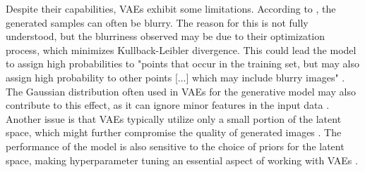 Despite their capabilities, VAEs exhibit some limitations. According to \citeauthor{GoodfellowDeepLearning}, the generated samples can often be blurry. The reason for this is not fully 
understood, but the blurriness observed may be due to their optimization process, which minimizes Kullback-Leibler divergence. This could lead the model to assign high probabilities to "points that occur in the training set, but may also assign high probability to other points [...] which may include blurry images" \citep{GoodfellowDeepLearning}. The Gaussian distribution often used in VAEs for the generative model may also contribute to this effect, as it can ignore minor features in the input data \citep{GoodfellowDeepLearning}. Another issue is that VAEs typically utilize only a small portion of the latent space, which might further compromise the quality of generated images \citep{GoodfellowDeepLearning}. The performance of the model is also sensitive to the choice of priors for the latent space, making hyperparameter tuning an essential aspect of working with VAEs \citep{kingmaVAE, higginsVAE}. 


